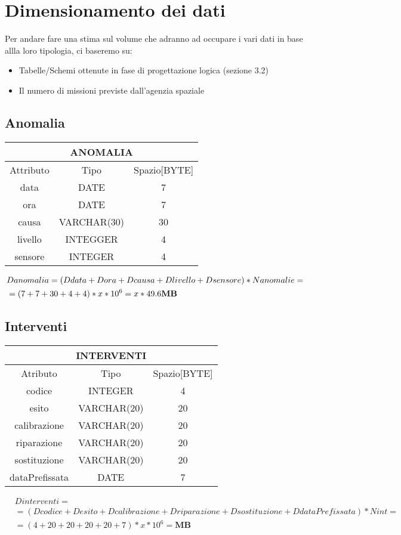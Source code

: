 \section{Dimensionamento dei dati}
Per andare fare una stima sul volume che adranno ad occupare i vari dati in base allla loro tipologia, ci baseremo su:
\begin{itemize}
\item Tabelle/Schemi ottenute in fase di progettazione logica (sezione 3.2)
\item Il numero di missioni previste dall'agenzia spaziale
\end{itemize}
\subsection{Anomalia}
\begin{tabular}{|c|c|c|}
  \hline
  \multicolumn{3}{|c|}{\textbf{ANOMALIA}}\\
  \hline
  Attributo & Tipo & Spazio[BYTE] \\
  \hline
  data & DATE & 7 \\
  ora & DATE & 7 \\
  causa & VARCHAR(30) & 30 \\
  livello & INTEGGER & 4 \\
  sensore & INTEGER & 4 \\
  \hline
\end{tabular}
\begin{equation}
  \begin{aligned}
    &Danomalia=(Ddata + Dora +Dcausa +Dlivello + Dsensore) * Nanomalie=\\
    &=(7+7+30+4+4)*x*10^6=x*49.6  \text{\textbf{MB}}\\
  \end{aligned}
\end{equation}
\subsection{Interventi}
\begin{tabular}{ |c|c|c|}
  \hline
  \multicolumn{3}{|c|}{\textbf{INTERVENTI}} \\
  \hline
  Atributo & Tipo & Spazio[BYTE] \\
  \hline
  codice & INTEGER & 4 \\
  esito & VARCHAR(20) & 20 \\
  calibrazione & VARCHAR(20) & 20 \\
  riparazione & VARCHAR(20) & 20 \\
  sostituzione & VARCHAR(20) & 20 \\
  dataPrefissata & DATE & 7 \\
  \hline
\end{tabular}
\begin{equation}
  \begin{aligned}
    &Dinterventi =\\
    &=(Dcodice + Desito +Dcalibrazione +Driparazione + Dsostituzione + DdataPrefissata) * Nint =\\
    &=(4+20+20+20+20+7)*x*10^6= \textbf{MB}
  \end{aligned}
\end{equation}

